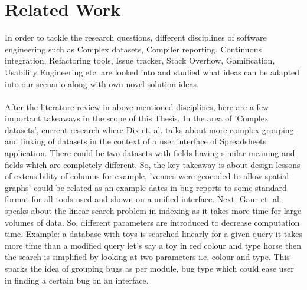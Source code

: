 \chapter{Related Work}
\label{ch:relatedwork}

In order to tackle the research questions, different disciplines of software engineering such as Complex datasets, Compiler reporting, Continuous integration, Refactoring tools, Issue tracker, Stack Overflow, Gamification, Usability Engineering etc. are looked into and studied what ideas can be adapted into our scenario along with own novel solution ideas. \\ \\

After the literature review in above-mentioned disciplines, here are a few important takeaways in the scope of this Thesis. In the area of 'Complex datasets', current research where Dix et. al. \cite{Dix} talks about more complex grouping and linking of datasets in the context of a user interface of Spreadsheets application. There could be two datasets with fields having similar meaning and fields which are completely different. So, the key takeaway is about design lessons of extensibility of columns for example, 'venues were geocoded to allow spatial graphs' could be related as an example dates in bug reports to some standard format for all tools used and shown on a unified interface. Next, Gaur et. al. \cite{Gaur} speaks about the linear search problem in indexing as it takes more time for large volumes of data. So, different parameters are introduced to decrease computation time. Example: a database with toys is searched linearly for a given query it takes more time than a modified query let's say a toy in red colour and type horse then the search is simplified by looking at two parameters i.e, colour and type. This sparks the idea of grouping bugs as per module, bug type which could ease user in finding a certain bug on an interface.  \\ \\

